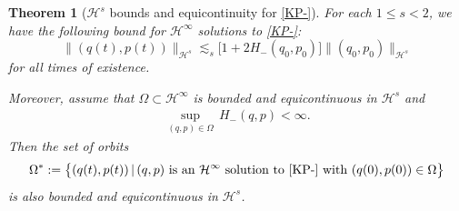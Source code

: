 \documentclass{amsart}
\newtheorem{theorem}{Theorem}[section]
\theoremstyle{definition}
\numberwithin{equation}{section}
\renewcommand{\H}{\mathcal H}
\begin{document}
\begin{theorem}[$\H^s$ bounds and equicontinuity for \eqref{KP-}]\label{T:confined} For each $1\leq s<2$, we have the following bound for $\H^\infty$ solutions to \eqref{KP-}:
\begin{equation}\label{Hs bdd confined}
\bigl\|(q(t),p(t))\bigr\|_{\H^s} \lesssim_s \bigl[1+2H_-(q_0,p_0)\bigr]\|(q_0,p_0)\|_{\H^s}
\end{equation}
for all times of existence.

Moreover, assume that $\Omega \subset \H^\infty$ is bounded and equicontinuous in $\H^s$ and
\begin{align}\label{bdd energy}
\sup_{(q,p)\in \Omega}\, H_-(q,p)<\infty. 
\end{align}
Then the set of orbits
$$
\Omega^*:= \bigl\{ (q(t),p(t))\,|\, (q,p)\text{ is an $\H^\infty$ solution to \eqref{KP-} with $(q(0), p(0))\in \Omega$}\bigr\}
$$
is also bounded and equicontinuous in $\H^s$.
\end{theorem}
\end{document}
